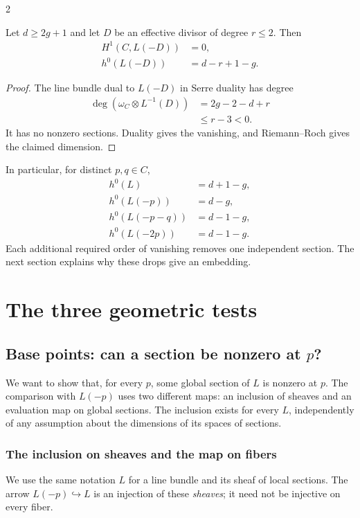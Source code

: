 \documentclass[12pt]{memoir}
\begin{document}
\begin{multicols}{2}
\begin{Lem}\label{lem:uniform}
Let $d\ge2g+1$ and let $D$ be an effective divisor of degree $r\le2$.
Then
\[
\begin{aligned}
 H^1(C,L(-D))&=0,\\
 h^0(L(-D))&=d-r+1-g.
\end{aligned}
\]
\end{Lem}
\begin{proof}
The line bundle dual to $L(-D)$ in Serre duality has degree
\[
\begin{aligned}
 \deg(\omega_C\otimes L^{-1}(D))
 &=2g-2-d+r\\
 &\le r-3<0.
\end{aligned}
\]
It has no nonzero sections. Duality gives the vanishing, and
Riemann--Roch gives the claimed dimension.
\end{proof}

In particular, for distinct $p,q\in C$,
\begin{equation}\label{eq:dimensions}
\begin{aligned}
 h^0(L)&=d+1-g,\\
 h^0(L(-p))&=d-g,\\
 h^0(L(-p-q))&=d-1-g,\\
 h^0(L(-2p))&=d-1-g.
\end{aligned}
\end{equation}
Each additional required order of vanishing removes one independent
section. The next section explains why these drops give an embedding.

\section{The three geometric tests}\label{sec:geometry}

\subsection{Base points: can a section be nonzero at $p$?}\label{sec:basepoints}
We want to show that, for every $p$, some global section of $L$ is
nonzero at $p$. The comparison with $L(-p)$ uses two different maps:
an inclusion of sheaves and an evaluation map on global sections.
The inclusion exists for every $L$, independently of any assumption
about the dimensions of its spaces of sections.

\subsubsection*{The inclusion on sheaves and the map on fibers}
We use the same notation $L$ for a line bundle and its sheaf of local
sections. The arrow $L(-p)\hookrightarrow L$ is an injection of these
\emph{sheaves}; it need not be injective on every fiber.


\end{multicols}
\end{document}
